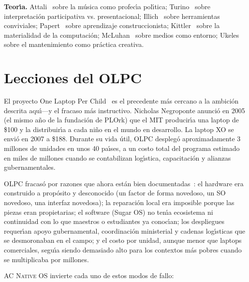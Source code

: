 \documentclass[10pt,letterpaper,twocolumn]{article}
\newcommand{\acos}{\textsc{AC Native OS}}
\begin{document}
\textbf{Teor\'{\i}a.} Attali~\citep{attali1985noise} sobre la m\'{u}sica como profec\'{\i}a pol\'{\i}tica; Turino~\citep{turino2008music} sobre interpretaci\'{o}n participativa vs. presentacional; Illich~\citep{illich1973tools} sobre herramientas conviviales; Papert~\citep{papert1980mindstorms} sobre aprendizaje construccionista; Kittler~\citep{kittler1995no} sobre la materialidad de la computaci\'{o}n; McLuhan~\citep{mcluhan1964understanding} sobre medios como entorno; Ukeles~\citep{ukeles1969manifesto} sobre el mantenimiento como pr\'{a}ctica creativa.


\section{Lecciones del OLPC}
\label{sec:olpc}

El proyecto One Laptop Per Child~\citep{negroponte1995being, kraemer2009olpc} es el precedente m\'{a}s cercano a la ambici\'{o}n descrita aqu\'{\i}---y el fracaso m\'{a}s instructivo. Nicholas Negroponte anunci\'{o} en 2005 (el mismo a\~{n}o de la fundaci\'{o}n de PLOrk) que el MIT producir\'{\i}a una laptop de \$100 y la distribuir\'{\i}a a cada ni\~{n}o en el mundo en desarrollo. La laptop XO se envi\'{o} en 2007 a \$188. Durante su vida \'{u}til, OLPC despleg\'{o} aproximadamente 3 millones de unidades en unos 40 pa\'{\i}ses, a un costo total del programa estimado en miles de millones cuando se contabilizan log\'{\i}stica, capacitaci\'{o}n y alianzas gubernamentales.

OLPC fracas\'{o} por razones que ahora est\'{a}n bien documentadas~\citep{kraemer2009olpc}: el hardware era construido a prop\'{o}sito y desconocido (un factor de forma novedoso, un SO novedoso, una interfaz novedosa); la reparaci\'{o}n local era imposible porque las piezas eran propietarias; el software (Sugar OS) no ten\'{\i}a ecosistema ni continuidad con lo que maestros o estudiantes ya conoc\'{\i}an; los despliegues requer\'{\i}an apoyo gubernamental, coordinaci\'{o}n ministerial y cadenas log\'{\i}sticas que se desmoronaban en el campo; y el costo por unidad, aunque menor que laptops comerciales, segu\'{\i}a siendo demasiado alto para los contextos m\'{a}s pobres cuando se multiplicaba por millones.

\acos{} invierte cada uno de estos modos de fallo:
\end{document}
